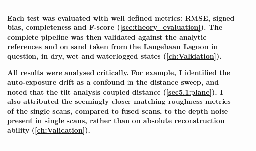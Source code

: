 {\begin{longtable}{>{\raggedright\arraybackslash}p{} >{\raggedright\arraybackslash}p{} >{\noindent\justifying\arraybackslash}p{}}
		Each test was evaluated with well defined metrics: RMSE, signed bias, completeness and F-score (\autoref{sec:theory_evaluation}). The complete pipeline was then validated against the analytic references and on sand taken from the Langebaan Lagoon in question, in dry, wet and waterlogged states (\autoref{ch:Validation}).
		
		All results were analysed critically. For example, I identified the auto-exposure drift as a confound in the distance sweep, and noted that the tilt analysis coupled distance (\autoref{sec5.1:plane}). I also attributed the seemingly closer matching roughness metrics of the single scans, compared to fused scans, to the depth noise present in single scans, rather than on absolute reconstruction ability (\autoref{ch:Validation}).
		
		\\
%		
		\cmidrule(lr){1-3}
		

\end{longtable}}
